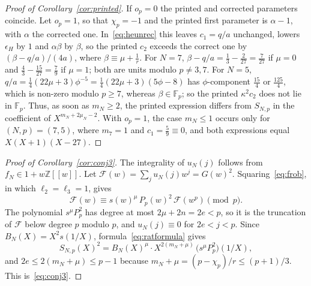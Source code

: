 \documentclass[11pt,a4paper]{article}
\theoremstyle{definition}
\theoremstyle{remark}
\newcommand{\F}{\mathbb{F}}
\newcommand{\Z}{\mathbb{Z}}
\numberwithin{equation}{section}
\begin{document}
\begin{proof}[Proof of Corollary~\ref{cor:printed}]
If $o_p=0$ the printed and corrected parameters coincide. Let $o_p=1$, so
that $\chi_p=-1$ and the printed first parameter is $\alpha-1$, with $\alpha$
the corrected one. In~\eqref{eq:heunrec} this leaves $c_1=q/a$ unchanged,
lowers $\epsilon_H$ by $1$ and $\alpha\beta$ by $\beta$, so the printed $c_2$
exceeds the correct one by $(\beta-q/a)/(4a)$, where
$\beta\equiv\mu+\frac1r$. For $N=7$,
$\beta-q/a=\frac13-\frac2{27}=\frac7{27}$ if $\mu=0$ and
$\frac43-\frac{15}{27}=\frac79$ if $\mu=1$; both are units modulo
$p\ne3,7$. For $N=5$, $q/a=\frac14(22\mu+3)\phi^{-5}=\frac14(22\mu+3)(5\phi-8)$
has $\phi$-component $\frac{15}4$ or $\frac{125}4$, which is non-zero modulo
$p\ge7$, whereas $\beta\in\F_p$; so the printed $\kappa^2c_2$ does not lie in
$\F_p$. Thus, as soon as $m_N\ge2$, the printed expression differs from
$S_{N,p}$ in the coefficient of $X^{m_N+2\mu_N-2}$. With $o_p=1$, the case
$m_N\le1$ occurs only for $(N,p)=(7,5)$, where $m_7=1$ and
$c_1=\frac59\equiv0$, and both expressions equal $X(X+1)(X-27)$.
\end{proof}

\begin{proof}[Proof of Corollary~\ref{cor:conj3}]
The integrality of $u_N(j)$ follows from $f_N\in1+w\Z[[w]]$. Let
$\mathcal F(w)=\sum_ju_N(j)w^j=G(w)^2$. Squaring~\eqref{eq:frob}, in which
$\ell_2=\ell_3=1$, gives
\[
\mathcal F(w)\equiv s(w)^{\mu}\,P_p(w)^2\,\mathcal F(w^p)\pmod p .
\]
The polynomial $s^\mu P_p^2$ has degree at most $2\mu+2n=2e<p$, so it is the
truncation of $\mathcal F$ below degree $p$ modulo $p$, and
$u_N(j)\equiv0$ for $2e<j<p$. Since $B_N(X)=X^2s(1/X)$,
formula~\eqref{eq:ratformula} gives
\[
S_{N,p}(X)^2=B_N(X)^{\mu}\cdot X^{2(m_N+\mu)}\,\bigl(s^\mu P_p^2\bigr)(1/X),
\]
and $2e\le2(m_N+\mu)\le p-1$ because $m_N+\mu=(p-\chi_p)/r\le(p+1)/3$. This
is~\eqref{eq:conj3}.
\end{proof}
\end{document}
